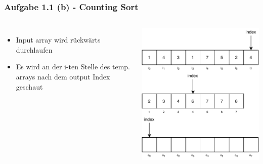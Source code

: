 \documentclass[aspectratio=169]{beamer}
\begin{document}
\begin{frame}
	\frametitle{Aufgabe 1.1 (b) - Counting Sort}
	\begin{columns}[c] %
	
	\begin{itemize}
		\item Input array wird rückwärts durchlaufen
		\item Es wird an der i-ten Stelle des temp. arrays nach dem output Index geschaut
	\end{itemize}
	
	\includegraphics[scale=.7]{cs10.pdf}
	
	\end{columns}
	\end{frame}
\end{document}
